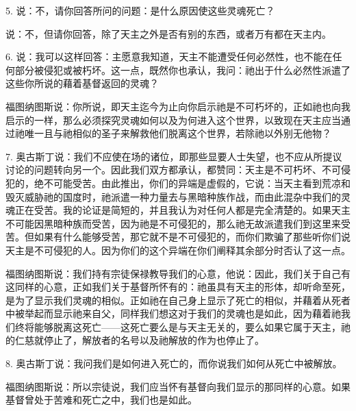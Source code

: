 5. 说：不，请你回答所问的问题：是什么原因使这些灵魂死亡？\par

说：不，但请你回答，除了天主之外是否有别的东西，或者万有都在天主内。\par

6. 说：我可以这样回答：主愿意我知道，天主不能遭受任何必然性，也不能在任何部分被侵犯或被朽坏。这一点，既然你也承认，我问：祂出于什么必然性派遣了这些你所说的藉着基督返回的灵魂？\par

福图纳图斯说：你所说，即天主迄今为止向你启示祂是不可朽坏的，正如祂也向我启示的一样，那么必须探究灵魂如何以及为何进入这个世界，以致现在天主应当通过祂唯一且与祂相似的圣子来解救他们脱离这个世界，若除祂以外别无他物？\par

7. 奥古斯丁说：我们不应使在场的诸位，即那些显要人士失望，也不应从所提议讨论的问题转向另一个。因此我们双方都承认，都赞同：天主是不可朽坏、不可侵犯的，绝不可能受苦。由此推出，你们的异端是虚假的，它说：当天主看到荒凉和毁灭威胁祂的国度时，祂派遣一种力量去与黑暗种族作战，而由此混杂中我们的灵魂正在受苦。我的论证是简短的，并且我认为对任何人都是完全清楚的。如果天主不可能因黑暗种族而受苦，因为祂是不可侵犯的，那么祂无故派遣我们到这里来受苦。但如果有什么能够受苦，那它就不是不可侵犯的，而你们欺骗了那些听你们说天主是不可侵犯的人。因为你们的这个异端在你们阐释其余部分时否认了这一点。\par

福图纳图斯说：我们持有宗徒保禄教导我们的心意，他说：因此，我们关于自己有这同样的心意，正如我们关于基督所怀有的：祂虽具有天主的形体，却听命至死，是为了显示我们灵魂的相似。正如祂在自己身上显示了死亡的相似，并藉着从死者中被举起而显示祂来自父，同样我们想这对于我们的灵魂也是如此，因为藉着祂我们终将能够脱离这死亡——这死亡要么是与天主无关的，要么如果它属于天主，祂的仁慈就停止了，解放者的名号以及祂解放的作为也停止了。\par

8. 奥古斯丁说：我问我们是如何进入死亡的，而你说我们如何从死亡中被解放。\par

福图纳图斯说：所以宗徒说，我们应当怀有基督向我们显示的那同样的心意。如果基督曾处于苦难和死亡之中，我们也是如此。\par

